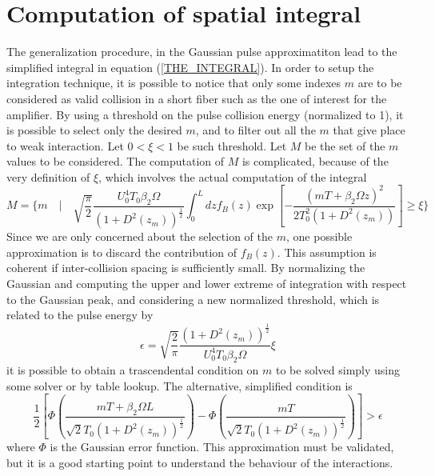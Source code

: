 \documentclass[10pt, lettersize, journal, onecolumn]{IEEEtran}
\begin{document}
\section{Computation of spatial integral}\label{computation}
The generalization procedure, in the Gaussian pulse approximatiton lead to the simplified integral in equation (\ref{THE_INTEGRAL}). In order to setup the integration technique, it is possible to notice that only some indexes $m$ are to be considered as valid collision in a short fiber such as the one of interest for the amplifier. By using a threshold on the pulse collision energy (normalized to 1), it is possible to select only the desired $m$, and to filter out all the $m$ that give place to weak interaction. Let $0<\xi<1$ be such threshold. Let $M$ be the set of the $m$ values to be considered. The computation of $M$ is complicated, because of the very definition of $\xi$, which involves the actual computation of the integral
\begin{equation}
	M = \bigg\{ m \quad \bigg| \quad \sqrt{\dfrac{\pi}{2}}\dfrac{U_0^4 T_0 \beta_2 \Omega}{(1+D^2(z_m))^{\frac{1}{2}}} \int_{0}^{L} dz f_B(z) \exp\left[-\dfrac{(mT+\beta_2\Omega z)^2}{2T_0^2(1+D^2(z_m))} \right] \geq \xi \bigg\}
\end{equation}
Since we are only concerned about the selection of the $m$, one possible approximation is to discard the contribution of $f_B(z)$.
This assumption is coherent if inter-collision spacing is sufficiently small.
By normalizing the Gaussian and computing the upper and lower extreme of integration with respect to the Gaussian peak, and considering a new normalized threshold, which is related to the pulse energy by
\begin{equation}
	\epsilon = \sqrt{\dfrac{2}{\pi}} \dfrac{(1+D^2(z_m))^\frac{1}{2}}{U_0^4 T_0 \beta_2 \Omega} \xi
\end{equation}
it is possible to obtain a trascendental condition on $m$ to be solved simply using some solver or by table lookup. The alternative, simplified condition is
\begin{equation}
		 \dfrac{1}{2} \left[\Phi \left(\dfrac{mT + \beta_2 \Omega L}{\sqrt{2} T_0 (1+D^2(z_m))^\frac{1}{2} }\right) - \Phi\left(\dfrac{mT}{\sqrt{2} T_0 (1+D^2(z_m))^\frac{1}{2} } \right) \right] > \epsilon
\end{equation}
where $\Phi$ is the Gaussian error function.
This approximation must be validated, but it is a good starting point to understand the behaviour of the interactions.
\end{document}
